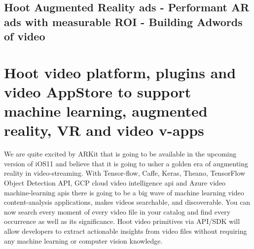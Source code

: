 \documentclass{article}
\begin{document}
%
\subsection{Hoot Augmented Reality ads - Performant AR ads with
  measurable ROI - Building Adwords of video }



\section{Hoot video platform, plugins and video AppStore to support machine learning,
  augmented reality, VR and video v-apps}
We are quite excited by ARKit that is going to be available in the
upcoming version of iOS11 and believe that it is going to usher a
golden era of augmenting reality in video-streaming. With Tensor-flow,
Caffe, Keras, Theano, TensorFlow Object Detection API, GCP cloud
video intelligence api and Azure video machine-learning apis there is going to be a
big wave of machine learning video content-analysis applications,
makes videos searchable, and discoverable. You can now search every
moment of every video file in your catalog and find every occurrence
as well as its significance. Hoot video primitives via API/SDK will allow developers to extract
actionable insights from video files without requiring any machine
learning or computer vision knowledge. 
\end{document}
